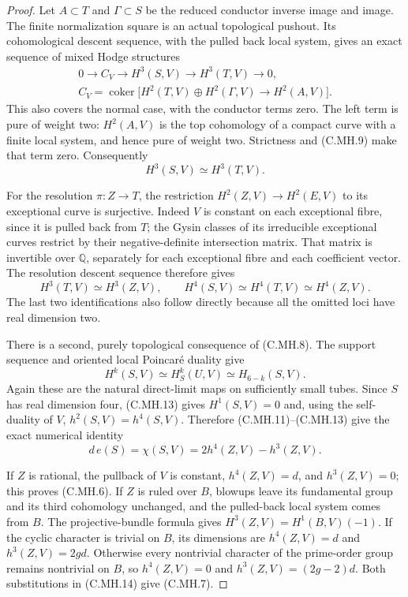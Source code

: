 \begin{proof}
Let $A\subset T$ and $\Gamma\subset S$ be the reduced
conductor inverse image and image. The finite
normalization square is an actual topological pushout.
Its cohomological descent sequence, with the pulled
back local system, gives an exact sequence of mixed
Hodge structures
\[
\begin{gathered}
0\longrightarrow C_V\longrightarrow H^3(S,V)
  \longrightarrow H^3(T,V)\longrightarrow0,\\
C_V=\operatorname{coker}\bigl[H^2(T,V)\oplus H^2(\Gamma,V)
                         \longrightarrow H^2(A,V)\bigr].
\end{gathered}
 \tag{C.MH.10}
\]
This also covers the normal case, with the conductor
terms zero. The left term is pure of weight two:
$H^2(A,V)$ is the top cohomology of a compact curve
with a finite local system, and hence pure of weight
two. Strictness and (C.MH.9) make that term zero.
Consequently
\[
                           H^3(S,V)\simeq H^3(T,V).
 \tag{C.MH.11}
\]

For the resolution $\pi:Z\to T$, the restriction
$H^2(Z,V)\to H^2(E,V)$ to its exceptional curve is
surjective. Indeed $V$ is constant on each exceptional
fibre, since it is pulled back from $T$; the Gysin
classes of its irreducible exceptional curves restrict
by their negative-definite intersection matrix. That
matrix is invertible over $\mathbb Q$, separately
for each exceptional fibre and each coefficient
vector. The resolution descent sequence therefore
gives
\[
 H^3(T,V)\simeq H^3(Z,V),\qquad
 H^4(S,V)\simeq H^4(T,V)\simeq H^4(Z,V).
 \tag{C.MH.12}
\]
The last two identifications also follow directly
because all the omitted loci have real dimension two.

There is a second, purely topological consequence of
(C.MH.8). The support sequence and oriented local
Poincar\'e duality give
\[
 H^k(S,V)\simeq H_S^k(U,V)
             \simeq H_{6-k}(S,V).
 \tag{C.MH.13}
\]
Again these are the natural direct-limit maps on
sufficiently small tubes. Since $S$ has real
dimension four, (C.MH.13) gives $H^1(S,V)=0$ and,
using the self-duality of $V$,
$h^2(S,V)=h^4(S,V)$. Therefore (C.MH.11)--(C.MH.13)
give the exact numerical identity
\[
 d\,e(S)=\chi(S,V)=2h^4(Z,V)-h^3(Z,V).
 \tag{C.MH.14}
\]

If $Z$ is rational, the pullback of $V$ is constant,
$h^4(Z,V)=d$, and $h^3(Z,V)=0$; this proves (C.MH.6).
If $Z$ is ruled over $B$, blowups leave its fundamental
group and its third cohomology unchanged, and the
pulled-back local system comes from $B$. The
projective-bundle formula gives
$H^3(Z,V)=H^1(B,V)(-1)$. If the cyclic character is
trivial on $B$, its dimensions are
$h^4(Z,V)=d$ and $h^3(Z,V)=2gd$. Otherwise every
nontrivial character of the prime-order group remains
nontrivial on $B$, so $h^4(Z,V)=0$ and
$h^3(Z,V)=(2g-2)d$. Both substitutions in (C.MH.14)
give (C.MH.7).
\end{proof}

